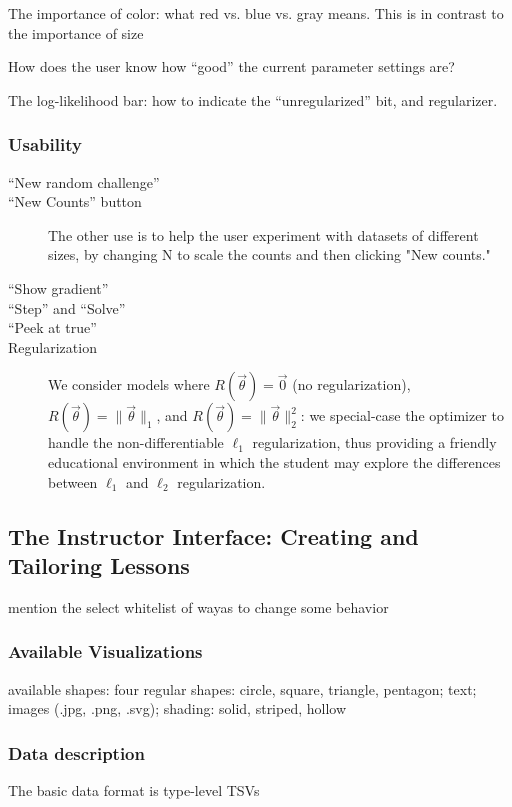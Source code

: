 \documentclass[11pt,letterpaper]{article}
\begin{document}
The importance of color: what red vs. blue vs. gray means. This is in contrast to the importance of size

How does the user know how ``good'' the current parameter settings are? 

The log-likelihood bar: how to indicate the ``unregularized'' bit, and regularizer.

\subsubsection{Usability}
\begin{description}
\item[``New random challenge'']
\item[``New Counts'' button] The other use is to help the user experiment with datasets of different sizes, by changing N to scale the counts and then clicking "New counts."
\item[``Show gradient'']
\item[``Step'' and ``Solve'']
\item[``Peek at true'']
\item[Regularization] We consider models where $R(\vec{\theta}) = \vec{0}$ (no regularization), $R(\vec{\theta}) = \|\vec\theta\|_1$, and $R(\vec{\theta}) = \|\vec{\theta}\|_2^2$: we special-case the optimizer to handle the non-differentiable $\ell_1$ regularization, thus providing a friendly educational environment in which the student may explore the differences between $\ell_1$ and $\ell_2$ regularization.
\end{description}

\subsection{The Instructor Interface: Creating and Tailoring Lessons}
mention the select whitelist of wayas to change some behavior
\subsubsection{Available Visualizations}
available shapes: four regular shapes: circle, square, triangle, pentagon; text; images (.jpg, .png, .svg);
shading: solid, striped, hollow

\subsubsection{Data description}
The basic data format is type-level TSVs
\end{document}
